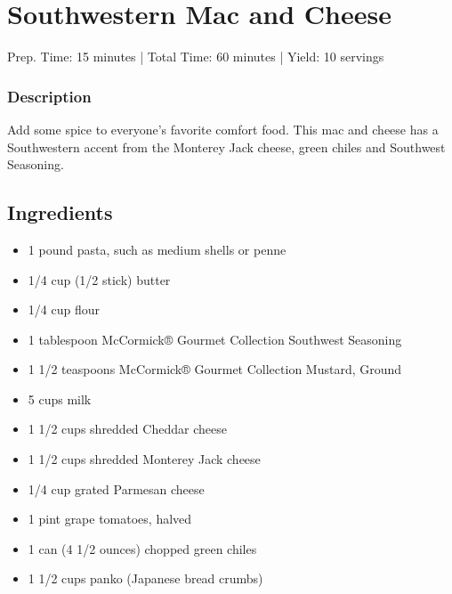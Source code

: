 \section{Southwestern Mac and Cheese}

\begin{center}
Prep. Time: 15 minutes |
Total Time: 60 minutes | 
Yield: 10 servings
\end{center}

\subsubsection{Description}
Add some spice to everyone's favorite comfort food. This mac and cheese has a Southwestern accent from the Monterey Jack cheese, green chiles and Southwest Seasoning.

\subsection{Ingredients}
\begin{multicols}{2}
\begin{itemize}
    \item 1 pound pasta, such as medium shells or penne
    \item 1/4 cup (1/2 stick) butter
    \item 1/4 cup flour
    \item 1 tablespoon McCormick® Gourmet Collection Southwest Seasoning
    \item 1 1/2 teaspoons McCormick® Gourmet Collection Mustard, Ground
    \item 5 cups milk
    \item 1 1/2 cups shredded Cheddar cheese
    \item 1 1/2 cups shredded Monterey Jack cheese
    \item 1/4 cup grated Parmesan cheese
    \item 1 pint grape tomatoes, halved
    \item 1 can (4 1/2 ounces) chopped green chiles
    \item 1 1/2 cups panko (Japanese bread crumbs)
\end{itemize}
\end{multicols}

